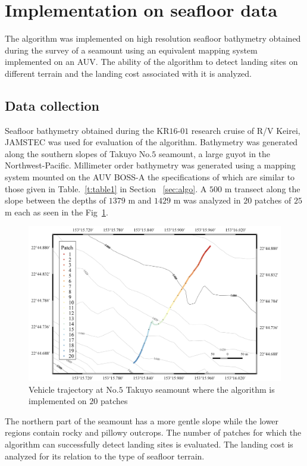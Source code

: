 \section{Implementation on seafloor data}

The algorithm was implemented on high resolution seafloor bathymetry obtained during the survey of a seamount using an equivalent mapping system implemented on an AUV. The ability of the algorithm to detect landing sites on different terrain and the landing cost associated with it is analyzed. 

\subsection{Data collection}

Seafloor bathymetry obtained during the KR$16$-$01$ research cruise of R/V Keirei, JAMSTEC was used for evaluation of the algorithm. Bathymetry was generated along the southern slopes of Takuyo No.$5$ seamount, a large guyot in the Northwest-Pacific. Millimeter order bathymetry was generated using a mapping system mounted on the AUV BOSS-A the specifications of which are similar to those given in Table.~\ref{t:table1} in Section ~\ref{sec:algo}.
	A $500$ m transect along the slope between the depths of $1379$ m and $1429$ 
	m was analyzed in $20$ patches of $25$ m each as seen in the 
	Fig~\ref{f:mehul24}. 
	
	
\begin{figure}[!ht]
\centering
\includegraphics[width=6in]{./images/mehul24.png}
\caption{Vehicle trajectory at No.$5$ Takuyo seamount where the algorithm is implemented on $20$ patches}
\label{f:mehul24}
\end{figure}

The northern part of the seamount has a more gentle 
	slope while the lower regions contain rocky and pillowy outcrops. The number 
	of patches for which the algorithm can successfully detect landing sites is 
	evaluated. The landing cost is analyzed for its relation to the type of 
	seafloor terrain.
	
